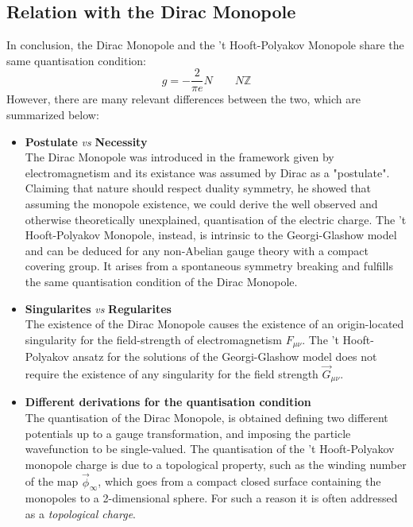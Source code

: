 \subsection{Relation with the Dirac Monopole}
In conclusion, the Dirac Monopole and the 't Hooft-Polyakov Monopole share the same quantisation condition: 
\begin{equation}
g = - \frac{2}{\pi e} N \qquad N  \mathbb{Z}
\end{equation}
However, there are many relevant differences between the two, which are summarized below:
\begin{itemize}
     \item \textbf{Postulate} \textit{vs} \textbf{Necessity}\medskip \\
    The Dirac Monopole was introduced in the framework given by electromagnetism and its existance was assumed by Dirac as a "postulate". Claiming that nature should respect duality symmetry, he showed that assuming the monopole existence, we could derive the well observed and otherwise theoretically unexplained, quantisation of the electric charge. 
    The 't Hooft-Polyakov Monopole, instead, is intrinsic to the Georgi-Glashow model and can be deduced for any non-Abelian gauge theory with a compact covering group. It arises from a spontaneous symmetry breaking and fulfills the same quantisation condition of the Dirac Monopole.
    
    \item \textbf{Singularites} \textit{vs} \textbf{Regularites}\medskip \\
    The existence of the Dirac Monopole causes the existence of an origin-located singularity for the field-strength of electromagnetism $F_{\mu \nu}$.
    The 't Hooft-Polyakov ansatz for the solutions of the Georgi-Glashow model does not require the existence of any singularity for the field strength $\vec{G}_{\mu \nu }$.
    
    \item \textbf{Different derivations for the quantisation condition} \medskip \\
    The quantisation of the Dirac Monopole, is obtained defining two different potentials up to a gauge transformation, and imposing the particle wavefunction to be single-valued. 
    The quantisation of the 't Hooft-Polyakov monopole charge is due to a topological property, such as the winding number of the map $\vec{\phi}_\infty $, which goes from a compact closed surface containing the monopoles to a 2-dimensional sphere. For such a reason it is often addressed as a \textit{topological charge}.
\end{itemize} 

